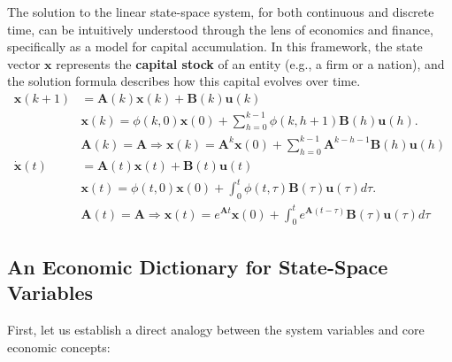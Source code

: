 The solution to the linear state-space system, for both continuous and discrete time, can be intuitively understood through the lens of economics and finance, specifically as a model for capital accumulation. In this framework, the state vector $\mathbf{x}$ represents the \textbf{capital stock} of an entity (e.g., a firm or a nation), and the solution formula describes how this capital evolves over time.
\begin{align*}
    \mathbf{x}(k + 1)    & = \mathbf{A}(k)\mathbf{x}(k) + \mathbf{B}(k)\mathbf{u}(k)                                                                       \tag{1}                                     \\
                         & \mathbf{x}(k)         = \phi (k,0)\mathbf{x}(0) + \sum_{h = 0}^{k - 1}\phi (k,h + 1)\mathbf{B}(h)\mathbf{u}(h).                                                             \\
                         & \mathbf{A}(k)         = \mathbf{A} \Longrightarrow \mathbf{x}(k) = \mathbf{A}^{k}\mathbf{x}(0) + \sum_{h = 0}^{k - 1}\mathbf{A}^{k - h - 1}\mathbf{B}(h)\mathbf{u}(h)       \\
    \dot{\mathbf{x}} (t) & = \mathbf{A}(t)\mathbf{x}(t) + \mathbf{B}(t)\mathbf{u}(t)                                                                                   \tag{2}                         \\
                         & \mathbf{x}(t)         = \phi (t,0)\mathbf{x}(0) + \int_{0}^{t}\phi (t,\tau)\mathbf{B}(\tau)\mathbf{u}(\tau)d\tau .                                                          \\
                         & \mathbf{A}(t)         = \mathbf{A} \Longrightarrow \mathbf{x}(t) = e^{\mathbf{A}t}\mathbf{x}(0) + \int_{0}^{t}e^{\mathbf{A}(t - \tau)}\mathbf{B}(\tau)\mathbf{u}(\tau)d\tau
\end{align*}


\subsection{An Economic Dictionary for State-Space Variables}

First, let us establish a direct analogy between the system variables and core economic concepts:

